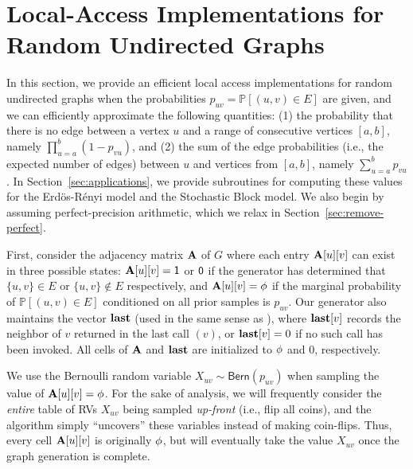 \section{Local-Access Implementations for Random Undirected Graphs}
\label{sec:undirected}

In this section, we provide an efficient local access implementations for random undirected graphs
when the probabilities $p_{uv}=\mathbb P[(u,v)\in E]$ are given, and we can efficiently approximate the following quantities:
(1) the probability that there is no edge between a vertex $u$ and a range of consecutive vertices $[a,b]$, namely $\prod_{u=a}^b (1-p_{vu})$, and
(2) the sum of the edge probabilities (i.e., the expected number of edges) between $u$ and vertices from $[a,b]$, namely $\sum_{u=a}^b p_{vu}$.
In Section~\ref{sec:applications}, we provide subroutines for computing these values for the Erd\"{o}s-R\'{e}nyi model and the Stochastic Block model.
We also begin by assuming perfect-precision arithmetic, which we relax in Section~\ref{sec:remove-perfect}.

\iffalse
{\color{blue}
Alternatively, we provide an implementation for these two models with a deterministic performance guarantee in Section~\ref{sec:ER-det}.
In this setting, introducing the \func{Vertex-Pair} queries results in an amortized guarantee on the run-time.
The deterministic guarantee comes at the cost of more complicated data-structures
(we use a two-level nested interval tree and binary search tree).
}
\fi

First, consider the adjacency matrix $\mathbf{A}$ of $G$ where each entry $\mathbf{A}[u][v]$ can exist in three possible states:
$\mathbf{A}[u][v] = \mathsf{1}$ or $\mathsf{0}$ if the generator has determined that $\{u,v\}\in E$ or $\{u,v\} \notin E$ respectively,
and $\mathbf{A}[u][v] = \phi$ if the marginal probability of $\mathbb P[(u,v)\in E]$ conditioned on all prior samples is $p_{uv}$.
Our generator also maintains the vector $\mathbf{last}$ (used in the same sense as \cite{reut}),
where $\mathbf{last}[v]$ records the neighbor of $v$ returned in the last call $(v)$, or $\mathbf{last}[v]=0$ if no such call has been invoked.
All cells of $\mathbf{A}$ and $\mathbf{last}$ are initialized to $\phi$ and $0$, respectively.

We use the Bernoulli random variable $X_{uv} \sim \mathsf{Bern}(p_{uv})$ when sampling the value of $\mathbf{A}[u][v]=\phi$.
For the sake of analysis, we will frequently consider the \emph{entire} table of RVs $X_{uv}$ being sampled \emph{up-front} (i.e., flip all coins),
and the algorithm simply ``uncovers'' these variables instead of making coin-flips.
Thus, every cell $\mathbf{A}[u][v]$ is originally $\phi$, but will eventually take the value $X_{uv}$ once the graph generation is complete.

